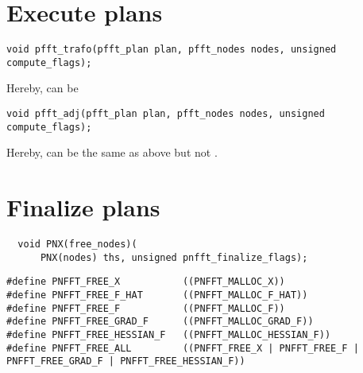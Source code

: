 \documentclass[a4paper,11pt,final,openright,headsepline]{scrreprt}
\numberwithin{figure}{chapter}
\numberwithin{table}{chapter}
\numberwithin{equation}{chapter}
\begin{document}
\section{Execute plans}
\begin{lstlisting}
void pfft_trafo(pfft_plan plan, pfft_nodes nodes, unsigned compute_flags);
\end{lstlisting}
Hereby,  can be
\begin{compactitem}
  \item {}
  \item {}
  \item {}
  \item {}
  \item {}
  \item {}
  \item {}
\end{compactitem}

\begin{lstlisting}
void pfft_adj(pfft_plan plan, pfft_nodes nodes, unsigned compute_flags);
\end{lstlisting}
Hereby,  can be the same as above but not .
\begin{compactitem}
  \item {}
\end{compactitem}

\section{Finalize plans}
\begin{lstlisting}
  void PNX(free_nodes)(
      PNX(nodes) ths, unsigned pnfft_finalize_flags);
\end{lstlisting}
\begin{lstlisting}
#define PNFFT_FREE_X           ((PNFFT_MALLOC_X))
#define PNFFT_FREE_F_HAT       ((PNFFT_MALLOC_F_HAT))
#define PNFFT_FREE_F           ((PNFFT_MALLOC_F))
#define PNFFT_FREE_GRAD_F      ((PNFFT_MALLOC_GRAD_F))
#define PNFFT_FREE_HESSIAN_F   ((PNFFT_MALLOC_HESSIAN_F))
#define PNFFT_FREE_ALL         ((PNFFT_FREE_X | PNFFT_FREE_F | PNFFT_FREE_GRAD_F | PNFFT_FREE_HESSIAN_F))
\end{lstlisting}



% 

\end{document}
